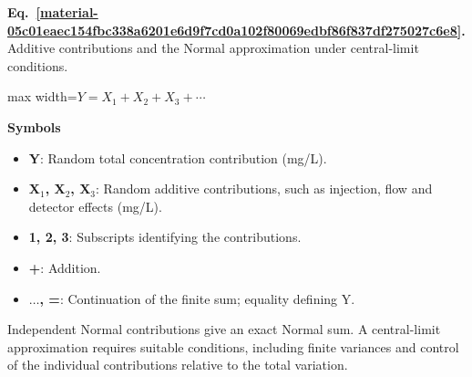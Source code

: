 \documentclass[11pt,a4paper]{article}
\begin{document}
\par\medskip
\noindent\begin{minipage}{\linewidth}
\label{material-05c01eaec154fbc338a6201e6d9f7cd0a102f80069edbf86f837df275027c6e8}
\noindent\textbf{Eq.~\ref*{material-05c01eaec154fbc338a6201e6d9f7cd0a102f80069edbf86f837df275027c6e8}.} Additive contributions and the Normal approximation under central-limit conditions.\par\nopagebreak
\begin{center}\begin{adjustbox}{max width=\linewidth}$\displaystyle Y=X_1+X_2+X_3+\cdots$\end{adjustbox}\end{center}

\par\noindent\textbf{Symbols}

\begin{itemize}\setlength{\itemsep}{1pt}\setlength{\parsep}{0pt}
\item \textbf{Y}: Random total concentration contribution (mg/L).
\item \textbf{X\ensuremath{{}_1}, X\ensuremath{{}_2}, X\ensuremath{{}_3}}: Random additive contributions, such as injection, flow and detector effects (mg/L).
\item \textbf{1, 2, 3}: Subscripts identifying the contributions.
\item \textbf{+}: Addition.
\item \textbf{\ensuremath{\ldots}, =}: Continuation of the finite sum; equality defining Y.
\end{itemize}

Independent Normal contributions give an exact Normal sum. A central-limit approximation requires suitable conditions, including finite variances and control of the individual contributions relative to the total variation.

\end{minipage}\par
\medskip
\end{document}

